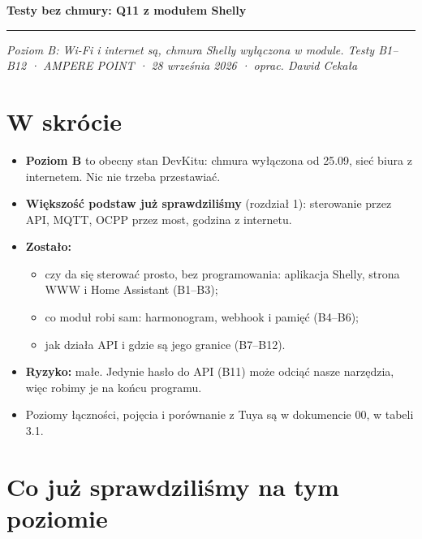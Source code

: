 \documentclass[11pt,a4paper]{article}
\begin{document}
{\LARGE\bfseries Testy bez chmury: Q11 z modułem Shelly\par}
\vspace{4pt}\textcolor{apteal}{\rule{\textwidth}{1.2pt}}
\emph{Poziom B: Wi-Fi i internet są, chmura Shelly wyłączona w module. Testy B1–B12 · AMPERE POINT · 28 września 2026 · oprac. Dawid Cekała}


\section*{W skrócie}

\begin{itemize}
\item \textbf{Poziom B} to obecny stan DevKitu: chmura wyłączona od 25.09, sieć biura z internetem. Nic nie trzeba przestawiać.
\item \textbf{Większość podstaw już sprawdziliśmy} (rozdział 1): sterowanie przez API, MQTT, OCPP przez most, godzina z internetu.
\item \textbf{Zostało:}
\begin{itemize}
\item czy da się sterować prosto, bez programowania: aplikacja Shelly, strona WWW i Home Assistant (B1–B3);
\item co moduł robi sam: harmonogram, webhook i pamięć (B4–B6);
\item jak działa API i gdzie są jego granice (B7–B12).
\end{itemize}
\item \textbf{Ryzyko:} małe. Jedynie hasło do API (B11) może odciąć nasze narzędzia, więc robimy je na końcu programu.
\item Poziomy łączności, pojęcia i porównanie z Tuya są w dokumencie 00, w tabeli 3.1.
\end{itemize}

\section{Co już sprawdziliśmy na tym poziomie}
\end{document}
